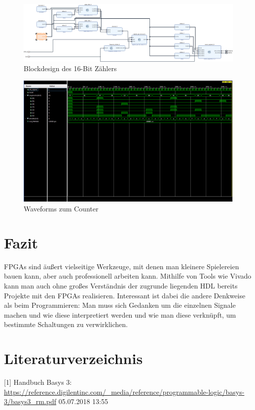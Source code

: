 \documentclass[11pt, a4paper]{article}
\begin{document}
\begin{figure}[H]    
    \centering
    \includegraphics[width=\linewidth]{versuch7Data/counter.pdf}
    \caption{Blockdesign des 16-Bit Zählers}
    \label{aufbauZähler}        
\end{figure}
\begin{figure}[H]    
    \centering
    \includegraphics[width=\linewidth]{versuch7Data/counter.png}
    \caption{Waveforms zum Counter}
    \label{waveformCounter}        
\end{figure}

\section*{Fazit}
FPGAs sind äußert vielseitige Werkzeuge, mit denen man kleinere Spielereien bauen kann, aber auch professionell arbeiten kann. Mithilfe von Tools wie Vivado kann man auch ohne großes Verständnis der zugrunde liegenden HDL bereits Projekte mit den FPGAs realisieren. Interessant ist dabei die andere Denkweise als beim Programmieren: Man muss sich Gedanken um die einzelnen Signale machen und wie diese interpretiert werden und wie man diese verknüpft, um bestimmte Schaltungen zu verwirklichen.

\section*{Literaturverzeichnis}
[1] Handbuch Basys 3:
\url{https://reference.digilentinc.com/_media/reference/programmable-logic/basys-3/basys3_rm.pdf}     05.07.2018 13:55
\end{document}
